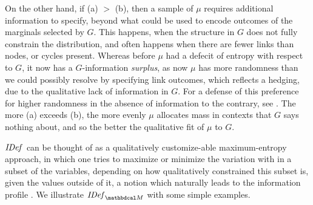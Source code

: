\documentclass[the-pdg-manual.tex]{subfiles}
\begin{document}
	On the other hand, if (a) $>$ (b), then a sample of $\mu$ requires additional information to specify, beyond what could be used to encode outcomes of the marginals selected by $G$. This happens, when the structure in $G$ does not fully constrain the distribution, and often happens when there are fewer links than nodes, or cycles present. Whereas before $\mu$ had a defecit of entropy with respect to $G$, it now has a $G$-information \emph{surplus}, as now $\mu$ has more randomness than we could possibly resolve by specifying link outcomes, which reflects a hedging, due to the qualitative lack of information in $G$. For a defense of this preference for higher randomness in the absence of information to the contrary, see \cite{maxent}\cite{adversarial_protection}. The more (a) exceeds (b), the more evenly $\mu$ allocates mass in contexts that $G$ says nothing about, and so the better the qualitative fit of $\mu$ to $G$.

	
	$\mathit{IDef}_{}$ can be thought of as a qualitatively customize-able maximum-entropy \cite{Jaynes57} approach, in which one tries to maximize or minimize the variation with in a subset of the variables, depending on how qualitatively constrained this subset is, given the values outside of it, a notion which naturally leads to the information profile . We illustrate $\IDef{\dg M}$ with some simple examples.  
\end{document}
